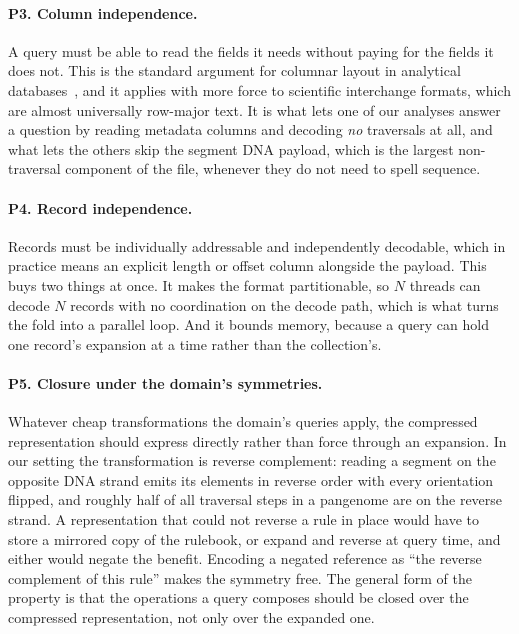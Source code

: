 \paragraph{P3. Column independence.}
A query must be able to read the fields it needs without paying for the fields it
does not. This is the standard argument for columnar layout in analytical
databases~\cite{abadi2006integrating,boncz2005monetdb}, and it applies with more
force to scientific interchange formats, which are almost universally row-major
text. It is what lets one of our analyses answer a question by reading metadata
columns and decoding \emph{no} traversals at all, and what lets the others skip
the segment DNA payload, which is the largest non-traversal component of the file,
whenever they do not need to spell sequence.

\paragraph{P4. Record independence.}
Records must be individually addressable and independently decodable, which in
practice means an explicit length or offset column alongside the payload. This
buys two things at once. It makes the format partitionable, so $N$ threads can
decode $N$ records with no coordination on the decode path, which is what turns
the fold into a parallel loop. And it bounds memory, because a query can hold one
record's expansion at a time rather than the collection's.

\paragraph{P5. Closure under the domain's symmetries.}
Whatever cheap transformations the domain's queries apply, the compressed
representation should express directly rather than force through an expansion. In
our setting the transformation is reverse complement: reading a segment on the
opposite DNA strand emits its elements in reverse order with every orientation
flipped, and roughly half of all traversal steps in a pangenome are on the reverse
strand. A representation that could not reverse a rule in place would have to
store a mirrored copy of the rulebook, or expand and reverse at query time, and
either would negate the benefit. Encoding a negated reference as ``the reverse
complement of this rule'' makes the symmetry free. The general form of the
property is that the operations a query composes should be closed over the
compressed representation, not only over the expanded one.

